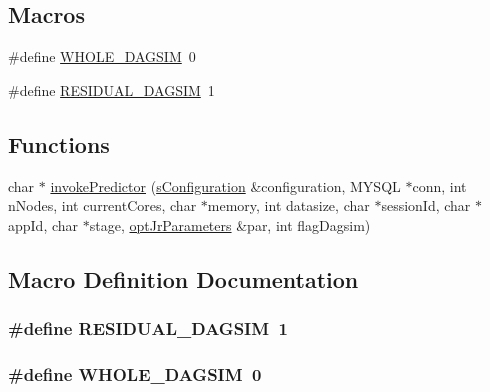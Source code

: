 \subsection*{Macros}
\begin{DoxyCompactItemize}
\item 
\#define \hyperlink{invokePredictor_8hh_a3806de5f70b6971cfe8be82520f4bf2a}{W\-H\-O\-L\-E\-\_\-\-D\-A\-G\-S\-I\-M}~0
\item 
\#define \hyperlink{invokePredictor_8hh_a016c9fba38e790ceafd4d9843f2dc564}{R\-E\-S\-I\-D\-U\-A\-L\-\_\-\-D\-A\-G\-S\-I\-M}~1
\end{DoxyCompactItemize}
\subsection*{Functions}
\begin{DoxyCompactItemize}
\item 
char $\ast$ \hyperlink{invokePredictor_8hh_a342ccdfe7923368e52a4894d69c7455a}{invoke\-Predictor} (\hyperlink{readConfigurationFile_8hh_ab8f35b1da3261263c5e9c0e7c8921f5c}{s\-Configuration} \&configuration, M\-Y\-S\-Q\-L $\ast$conn, int n\-Nodes, int current\-Cores, char $\ast$memory, int datasize, char $\ast$session\-Id, char $\ast$app\-Id, char $\ast$stage, \hyperlink{classoptJrParameters}{opt\-Jr\-Parameters} \&par, int flag\-Dagsim)
\end{DoxyCompactItemize}


\subsection{Macro Definition Documentation}
\hypertarget{invokePredictor_8hh_a016c9fba38e790ceafd4d9843f2dc564}{
\subsubsection[{R\-E\-S\-I\-D\-U\-A\-L\-\_\-\-D\-A\-G\-S\-I\-M}]{\setlength{\rightskip}{0pt plus 5cm}\#define R\-E\-S\-I\-D\-U\-A\-L\-\_\-\-D\-A\-G\-S\-I\-M~1}}\label{invokePredictor_8hh_a016c9fba38e790ceafd4d9843f2dc564}
\hypertarget{invokePredictor_8hh_a3806de5f70b6971cfe8be82520f4bf2a}{
\subsubsection[{W\-H\-O\-L\-E\-\_\-\-D\-A\-G\-S\-I\-M}]{\setlength{\rightskip}{0pt plus 5cm}\#define W\-H\-O\-L\-E\-\_\-\-D\-A\-G\-S\-I\-M~0}}\label{invokePredictor_8hh_a3806de5f70b6971cfe8be82520f4bf2a}


